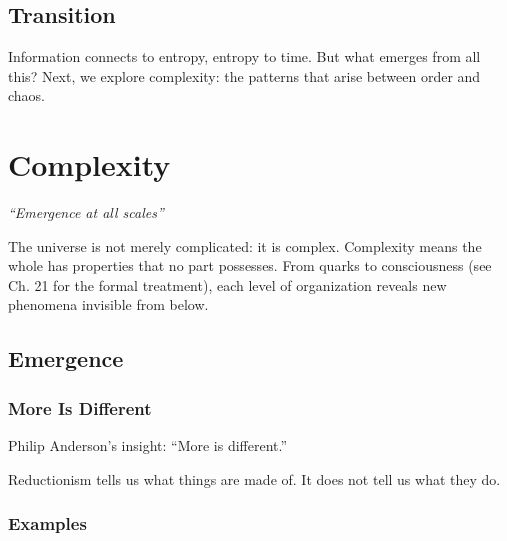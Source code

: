 \documentclass[
  11pt,
  letterpaper,
  twoside,
  openright]{book}
\begin{document}
\section{Transition}\label{transition-40}

Information connects to entropy, entropy to time. But what emerges from
all this? Next, we explore complexity: the patterns that arise between
order and chaos.

\chapter{Complexity}\label{sec-complexity}

\emph{``Emergence at all scales''}

\begin{tcolorbox}[enhanced jigsaw, leftrule=.75mm, title=\textcolor{quarto-callout-note-color}{\faInfo}\hspace{0.5em}{Key Revelation}, bottomrule=.15mm, opacityback=0, coltitle=black, arc=.35mm, colframe=quarto-callout-note-color-frame, colbacktitle=quarto-callout-note-color!10!white, colback=white, titlerule=0mm, breakable, bottomtitle=1mm, toptitle=1mm, rightrule=.15mm, toprule=.15mm, left=2mm, opacitybacktitle=0.6]

The universe is not merely complicated: it is complex. Complexity means
the whole has properties that no part possesses. From quarks to
consciousness (see Ch. 21 for the formal treatment), each level of
organization reveals new phenomena invisible from below.

\end{tcolorbox}

\section{Emergence}\label{emergence}

\subsection{More Is Different}\label{more-is-different}

Philip Anderson's insight: ``More is different.''

Reductionism tells us what things are made of. It does not tell us what
they do.

\subsection{Examples}\label{examples-7}
\end{document}
